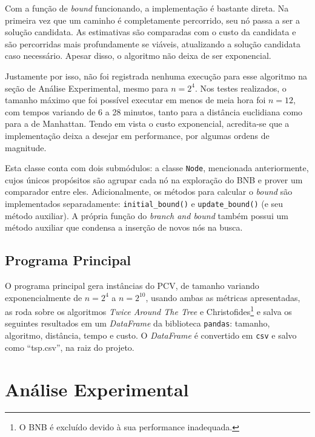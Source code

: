 \documentclass{article}
\begin{document}
\begin{itemize}
	      Com a função de \textit{bound} funcionando, a implementação é bastante direta. Na primeira vez que um caminho é completamente percorrido, seu nó passa a ser a solução candidata. As estimativas são comparadas com o custo da candidata e são percorridas mais profundamente se viáveis, atualizando a solução candidata caso necessário. Apesar disso, o algoritmo não deixa de ser exponencial.

	      Justamente por isso, não foi registrada nenhuma execução para esse algoritmo na seção de Análise Experimental, mesmo para \( n = 2^4 \). Nos testes realizados, o tamanho máximo que foi possível executar em menos de meia hora foi \( n = 12 \), com tempos variando de 6 a 28 minutos, tanto para a distância euclidiana como para a de Manhattan. Tendo em vista o custo exponencial, acredita-se que a implementação deixa a desejar em performance, por algumas ordens de magnitude.

	      Esta classe conta com dois submódulos: a classe \texttt{Node}, mencionada anteriormente, cujos únicos propósitos são agrupar cada nó na exploração do BNB e prover um comparador entre eles. Adicionalmente, os métodos para calcular o \textit{bound} são implementados separadamente: \texttt{initial\_bound()} e \texttt{update\_bound()} (e seu método auxiliar). A própria função do \textit{branch and bound} também possui um método auxiliar que condensa a inserção de novos nós na busca.

\end{itemize}

\subsection{Programa Principal}

O programa principal gera instâncias do PCV, de tamanho variando exponencialmente de \( n=2^{4} \) a \( n=2^{10} \), usando ambas as métricas apresentadas, as roda sobre os algoritmos \textit{Twice Around The Tree} e Christofides\footnote{O BNB é excluído devido à sua performance inadequada.} e salva os seguintes resultados em um \textit{DataFrame} da biblioteca \texttt{pandas}: tamanho, algoritmo, distância, tempo e custo. O \textit{DataFrame} é convertido em \texttt{csv} e salvo como ``tsp.csv'', na raiz do projeto.

\section{Análise Experimental}
\end{document}
